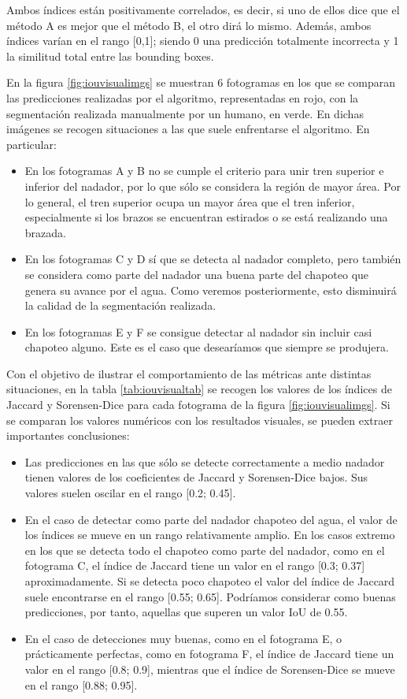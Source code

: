 Ambos índices están positivamente correlados, es decir, si uno de ellos dice que el método A es mejor que el método B, el otro dirá lo mismo. Además, ambos índices varían en el rango [0,1]; siendo 0 una predicción totalmente incorrecta y 1 la similitud total entre las bounding boxes. 

En la figura \ref{fig:iouvisualimgs} se muestran 6 fotogramas en los que se comparan las predicciones realizadas por el algoritmo, representadas en rojo, con la segmentación realizada manualmente por un humano, en verde. En dichas imágenes se recogen situaciones a las que suele enfrentarse el algoritmo. En particular:
\begin{itemize}
    \item En los fotogramas A y B no se cumple el criterio para unir tren superior e inferior del nadador, por lo que sólo se considera la región de mayor área. Por lo general, el tren superior ocupa un mayor área que el tren inferior, especialmente si los brazos se encuentran estirados o se está realizando una brazada.
    \item En los fotogramas C y D sí que se detecta al nadador completo, pero también se considera como parte del nadador una buena parte del chapoteo que genera su avance por el agua. Como veremos posteriormente, esto disminuirá la calidad de la segmentación realizada.
    \item En los fotogramas E y F se consigue detectar al nadador sin incluir casi chapoteo alguno. Este es el caso que desearíamos que siempre se produjera.
\end{itemize}  

Con el objetivo de ilustrar el comportamiento de las métricas ante distintas situaciones, en la tabla \ref{tab:iouvisualtab} se recogen los valores de los índices de Jaccard y Sorensen-Dice para cada fotograma de la figura \ref{fig:iouvisualimgs}. Si se comparan los valores numéricos con los resultados visuales, se pueden extraer importantes conclusiones:
\begin{itemize}
    \item Las predicciones en las que sólo se detecte correctamente a medio nadador tienen valores de los coeficientes de Jaccard y Sorensen-Dice bajos. Sus valores suelen oscilar en el rango [0.2; 0.45]. 
    \item En el caso de detectar como parte del nadador chapoteo del agua, el valor de los índices se mueve en un rango relativamente amplio. En los casos extremo en los que se detecta todo el chapoteo como parte del nadador, como en el fotograma C, el índice de Jaccard tiene un valor en el rango [0.3; 0.37] aproximadamente. Si se detecta poco chapoteo el valor del índice de Jaccard suele encontrarse en el rango [0.55; 0.65]. Podríamos considerar como buenas predicciones, por tanto, aquellas que superen un valor IoU de 0.55.
    \item En el caso de detecciones muy buenas, como en el fotograma E, o prácticamente perfectas, como en fotograma F, el índice de Jaccard tiene un valor en el rango [0.8; 0.9], mientras que el índice de Sorensen-Dice se mueve en el rango [0.88; 0.95].
\end{itemize}
 
